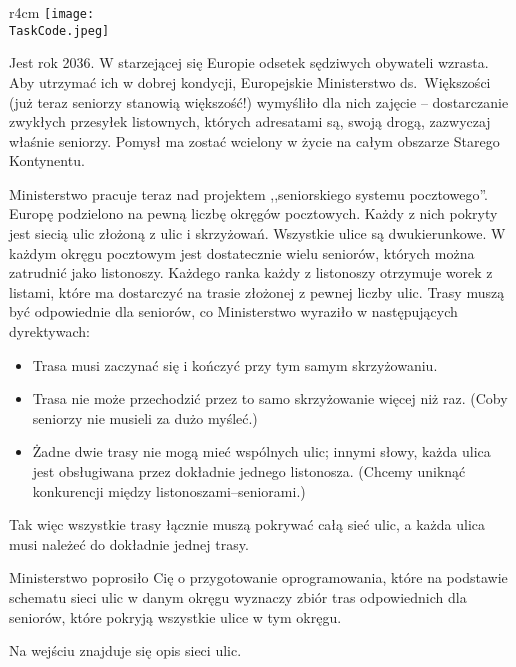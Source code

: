 \documentclass{boi2014-pl}
\renewcommand{\TaskCode}{postmen}
\begin{document}
    \begin{wrapfigure}[8]{r}{4cm}
        \vspace{-18pt}
		\texttt{[image: \\TaskCode.jpeg]}
	\end{wrapfigure}
    Jest rok 2036.
    W starzejącej się Europie odsetek sędziwych obywateli wzrasta.
    Aby utrzymać ich w dobrej kondycji, Europejskie Ministerstwo ds.\ Większości
    (już teraz seniorzy stanowią większość!) wymyśliło dla nich zajęcie -- dostarczanie
    zwykłych przesyłek listownych, których adresatami są, swoją drogą, zazwyczaj właśnie seniorzy.
    Pomysł ma zostać wcielony w życie na całym obszarze Starego Kontynentu.

    Ministerstwo pracuje teraz nad projektem ,,seniorskiego systemu pocztowego''.
    Europę podzielono na pewną liczbę okręgów pocztowych.
    Każdy z nich pokryty jest siecią ulic złożoną z ulic i skrzyżowań.
    Wszystkie ulice są dwukierunkowe.
    W każdym okręgu pocztowym jest dostatecznie wielu seniorów, których można zatrudnić
    jako listonoszy.
    Każdego ranka każdy z listonoszy otrzymuje worek z listami, które ma dostarczyć
    na trasie złożonej z pewnej liczby ulic.
    Trasy muszą być odpowiednie dla seniorów, co Ministerstwo wyraziło
    w następujących dyrektywach:

    \begin{itemize}
        \item Trasa musi zaczynać się i kończyć przy tym samym skrzyżowaniu.
        \item Trasa nie może przechodzić przez to samo skrzyżowanie więcej niż raz.
          (Coby seniorzy nie musieli za dużo myśleć.)
        \item Żadne dwie trasy nie mogą mieć wspólnych ulic;
          innymi słowy, każda ulica jest obsługiwana przez
          dokładnie jednego listonosza.
          (Chcemy uniknąć konkurencji między listonoszami--seniorami.)
    \end{itemize}

    Tak więc wszystkie trasy łącznie muszą pokrywać całą sieć ulic, a każda ulica musi należeć
    do dokładnie jednej trasy.

    \Task
    Ministerstwo poprosiło Cię o przygotowanie oprogramowania, które
    na podstawie schematu sieci ulic w danym okręgu wyznaczy zbiór tras
    odpowiednich dla seniorów, które pokryją wszystkie ulice w tym okręgu.

    \Input
    Na wejściu znajduje się opis sieci ulic.
\end{document}
